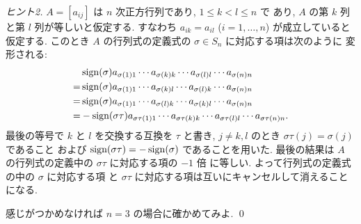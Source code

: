 \documentclass[12pt,twoside]{jarticle}
\begin{document}
\begin{proof}[ヒント2]
  $A=[a_{ij}]$ は $n$ 次正方行列であり, $1\le k<l\le n$ で
  あり, $A$ の第 $k$ 列と第 $l$ 列が等しいと仮定する.
  すなわち $a_{ik} = a_{il}$ ($i=1,\ldots,n$) が成立していると仮定する.
  このとき $A$ の行列式の定義式の $\sigma\in S_n$ に対応する項は次のように
  変形される:
  \begin{align*}
    &
    \mathop{\mathrm{sign}}\nolimits(\sigma) a_{\sigma(1)1}
    \cdots a_{\sigma(k)k}\cdots a_{\sigma(l)l}
    \cdots a_{\sigma(n)n}
    \\ = &
    \mathop{\mathrm{sign}}\nolimits(\sigma) a_{\sigma(1)1}
    \cdots a_{\sigma(k)l}\cdots a_{\sigma(l)k}
    \cdots a_{\sigma(n)n}
    \\ = &
    \mathop{\mathrm{sign}}\nolimits(\sigma) a_{\sigma(1)1}
    \cdots a_{\sigma(l)k}\cdots a_{\sigma(k)l}
    \cdots a_{\sigma(n)n}
    \\ = &
    -\mathop{\mathrm{sign}}\nolimits(\sigma\tau) a_{\sigma\tau(1)1}
    \cdots a_{\sigma\tau(k)k}\cdots a_{\sigma\tau(l)l}
    \cdots a_{\sigma\tau(n)n}.
  \end{align*}
  最後の等号で $k$ と $l$ を交換する互換を $\tau$ と書き, 
  $j\ne k,l$ のとき $\sigma\tau(j)=\sigma(j)$ であること
  および $\mathop{\mathrm{sign}}\nolimits(\sigma\tau)=-\mathop{\mathrm{sign}}\nolimits(\sigma)$ であることを用いた.
  最後の結果は $A$ の行列式の定義中の $\sigma\tau$ に対応する項の $-1$ 倍
  に等しい.  よって行列式の定義式の中の $\sigma$ に対応する項
  と $\sigma\tau$ に対応する項は互いにキャンセルして消えることになる.

  感じがつかめなければ $n=3$ の場合に確かめてみよ.
  \qed
\end{proof}

\end{document}
